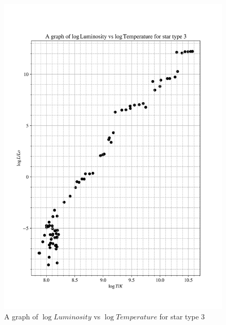 \documentclass[12pt, a4paper]{article}
\begin{document}
\begin{figure}[H]
    \centering
    \includegraphics[width = \textwidth]{2Plot3.png}
    \caption{A graph of \(\log{Luminosity}\) vs \(\log{Temperature}\) for star type 3}
    \label{fig:Fig 2.3}
\end{figure}
\end{document}
